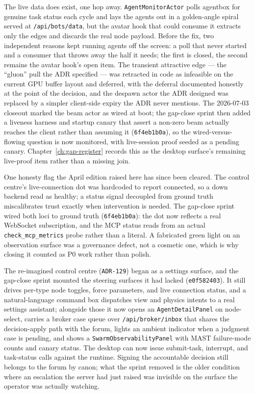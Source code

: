 The live data does exist, one hop away. \texttt{AgentMonitorActor} polls agentbox for genuine task status each cycle and lays the agents out in a golden-angle spiral served at \texttt{/api/bots/data}, but the avatar hook that could consume it extracts only the edges and discards the real node payload. Before the fix, two independent reasons kept running agents off the screen: a poll that never started and a consumer that throws away the half it needs; the first is closed, the second remains the avatar hook's open item. The transient attractive edge --- the ``gluon'' pull the ADR specified --- was retracted in code as infeasible on the current GPU buffer layout and deferred, with the deferral documented honestly at the point of the decision, and the despawn actor the ADR designed was replaced by a simpler client-side expiry the ADR never mentions. The 2026-07-03 closeout marked the beam actor as wired at boot; the gap-close sprint then added a liveness harness and startup canary that assert a non-zero beam actually reaches the client rather than assuming it (\texttt{6f4eb1b0a}), so the wired-versus-flowing question is now monitored, with live-session proof seeded as a pending canary. Chapter~\ref{ch:gap-register} records this as the desktop surface's remaining live-proof item rather than a missing join.

One honesty flag the April edition raised here has since been cleared. The control centre's live-connection dot was hardcoded to report connected, so a down backend read as healthy; a status signal decoupled from ground truth miscalibrates trust exactly when intervention is needed. The gap-close sprint wired both loci to ground truth (\texttt{6f4eb1b0a}): the dot now reflects a real WebSocket subscription, and the MCP status reads from an actual \texttt{check\_mcp\_metrics} probe rather than a literal. A fabricated green light on an observation surface was a governance defect, not a cosmetic one, which is why closing it counted as P0 work rather than polish.

The re-imagined control centre (\texttt{ADR-129}) began as a settings surface, and the gap-close sprint mounted the steering surfaces it had lacked (\texttt{e0f582403}). It still drives per-type node toggles, force parameters, and live connection status, and a natural-language command box dispatches view and physics intents to a real settings assistant; alongside those it now opens an \texttt{AgentDetailPanel} on node-select, carries a broker case queue over \texttt{/api/broker/inbox} that shares the decision-apply path with the forum, lights an ambient indicator when a judgment case is pending, and shows a \texttt{SwarmObservabilityPanel} with MAST failure-mode counts and canary status. The desktop can now issue submit-task, interrupt, and task-status calls against the runtime. Signing the accountable decision still belongs to the forum by canon; what the sprint removed is the older condition where an escalation the server had just raised was invisible on the surface the operator was actually watching.


